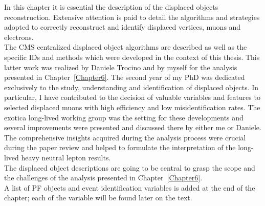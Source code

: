 In this chapter it is essential the description of the displaced objects
reconstruction. Extensive attention is paid 
to detail the algorithms and strategies adopted to
correctly reconstruct and identify displaced vertices, muons and
electrons. \\
The CMS centralized displaced object algorithms are
described as well as the specific IDs and methods which were developed in
the context of this thesis. This latter work was realized by Daniele
Trocino and by myself for the analysis presented in
Chapter~\ref{Chapter6}. The second year of my PhD was dedicated
exclusively to the study, understanding and identification of
displaced objects. In particular, I have contributed to the
decision of valuable variables and features to selected displaced muons with
high efficiency and low misidentification rates. The exotica long-lived working group was the
setting for these developments and several improvements were presented
and discussed there by either me or Daniele. The comprehensive
insights acquired during the analysis process were crucial during the
paper review and helped to formulate the interpretation of the
long-lived heavy neutral lepton results.\\
The displaced object descriptions are going to be central to grasp the
scope and the challenges of the analysis presented in
Chapter~\ref{Chapter6}. \\

A list of PF objects and event identification variables is added at
the end of the chapter; each of the variable will be found later on
the text.